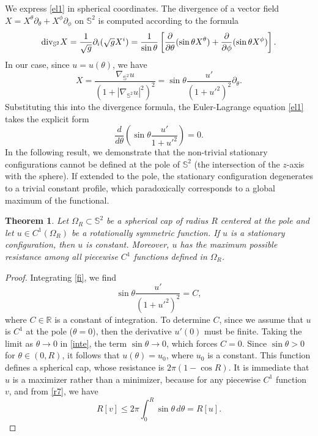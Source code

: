 \documentclass[a4paper,12pt]{amsart}
\theoremstyle{plain}
\newtheorem{theorem}{Theorem}[section]
\theoremstyle{definition}
\def\s{\mathbb S}
\begin{document}
We express \eqref{el1} in spherical coordinates. The divergence of a vector field $X = X^\theta \partial_\theta + X^\phi \partial_\phi$ on $\s^2$ is computed according to the formula 
\begin{equation*}
 {\rm div}_{\mathbb{S}^2} X = \frac{1}{\sqrt{g}} \partial_i (\sqrt{g} X^i) = \frac{1}{\sin\theta} \left[ \frac{\partial}{\partial \theta} (\sin\theta X^\theta) + \frac{\partial}{\partial \phi} (\sin\theta X^\phi) \right].
\end{equation*}
In our case, since $u=u(\theta)$, we have 
$$X= \frac{\nabla_{\mathbb{S}^2} u}{ (1 + |\nabla_{\mathbb{S}^2} u|^2)^{2}}=\sin\theta\frac{u'}{(1+u'^2)^2}\partial_\theta.$$ 
Substituting this into the divergence formula, the Euler-Lagrange equation \eqref{el1} takes the explicit form 
\begin{equation}\label{fi}
 \frac{d}{d \theta} \left( \sin\theta \frac{u'}{1+u'^2}\right) = 0.
 \end{equation} 
 In the following result, we demonstrate that the non-trivial stationary configurations cannot be defined at the pole of $\s^2$ (the intersection of the $z$-axis with the sphere). If extended to the pole, the stationary configuration degenerates to a trivial constant profile, which paradoxically corresponds to a global maximum of the functional.

\begin{theorem}\label{t29}
Let $\Omega_R \subset \mathbb{S}^2$ be a spherical cap of radius $R$ centered at the pole and let $u \in C^1(\Omega_R)$ be a rotationally symmetric function. If $u$ is a stationary configuration, then $u$ is constant. Moreover, $u$ has the maximum possible resistance among all  piecewise $C^1$  functions defined in $\Omega_R$.
\end{theorem}

\begin{proof}
Integrating \eqref{fi}, we find 
\begin{equation} \label{inte}
 \sin\theta \frac{u'}{\left(1 + u'^2\right)^2} = C,
\end{equation}
where $C \in \mathbb{R}$ is a constant of integration. To determine $C$,   since we assume that $u$ is $C^1$ at the pole ($\theta=0$), then the derivative $u'(0)$ must be finite. Taking the limit as $\theta \to 0$ in \eqref{inte}, the term $\sin\theta \to 0$, which forces $C = 0$. Since $\sin\theta > 0$ for $\theta \in (0, R)$, it follows that $u(\theta) = u_0$, where $u_0$ is a constant. This function defines a spherical cap, whose resistance is $2\pi(1-\cos R)$. It is immediate that $u$ is a maximizer rather than a minimizer, because for any  piecewise $C^1$ function $v$, and from \eqref{r7}, we have 
$$ R[v] \leq 2\pi \int_0^{R} \sin\theta \, d\theta=R[u]. $$
 \end{proof}
\end{document}
